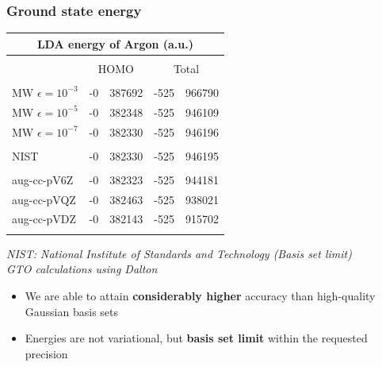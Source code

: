 \begin{frame}
\frametitle{Ground state energy}
\centering
\begin{table}
    \centering
    \begin{tabular}{lr@{.}lr@{.}l}
    \multicolumn{5}{c}{\textbf{LDA energy of Argon (a.u.)}}\\
    \hline
    \hline
                        &\multicolumn{4}{c}{}   \\
    &\multicolumn{2}{c}{HOMO}
    &\multicolumn{2}{c}{Total}\\
                        &\multicolumn{4}{c}{}   \\
    MW $\epsilon=10^{-3}$  &-0&387692&-525&966790  \\
    MW $\epsilon=10^{-5}$  &-0&382348&-525&946109  \\
    MW $\epsilon=10^{-7}$  &-0&382330&-525&946196  \\
                        &\multicolumn{4}{c}{}   \\
    NIST                &-0&382330&-525&946195  \\
                        &\multicolumn{4}{c}{}   \\
    aug-cc-pV6Z		&-0&382323&-525&944181  \\
    aug-cc-pVQZ		&-0&382463&-525&938021  \\
    aug-cc-pVDZ		&-0&382143&-525&915702  \\
                        &\multicolumn{4}{c}{}   \\
    \hline
    \hline
    \end{tabular}
\end{table}

\vspace{1mm}

\tiny

\it{NIST: National Institute of Standards and Technology (Basis set limit)}\\
\it{GTO calculations using Dalton}

\vspace{5mm}

\scriptsize

\begin{itemize}
    \item   We are able to attain \textbf{considerably higher} accuracy than 
            high-quality Gaussian basis sets
    \item   Energies are not variational, but \textbf{basis set limit} within 
            the requested precision
\end{itemize}

\end{frame}

